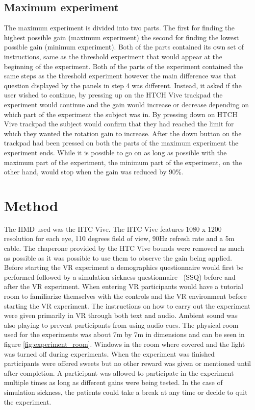 \subsection{Maximum experiment}
The maximum experiment is divided into two parts. The first for finding the highest possible gain (maximum experiment) the second for finding the lowest possible gain (minimum experiment). Both of the parts contained its own set of instructions, same as the threshold experiment that would appear at the beginning of the experiment. Both of the parts of the experiment contained the same steps as the threshold experiment however the main difference was that question displayed by the panels in step 4 was different. Instead, it asked if the user wished to continue, by pressing up on the HTCH Vive trackpad the experiment would continue and the gain would increase or decrease depending on which part of the experiment the subject was in. By pressing down on HTCH Vive trackpad the subject would confirm that they had reached the limit for which they wanted the rotation gain to increase. After the down button on the trackpad had been pressed on both the parts of the maximum experiment the experiment ends. While it is possible to go on as long as possible with the maximum part of the experiment, the minimum part of the experiment, on the other hand, would stop when the gain was reduced by 90\%.






\section{Method}
The HMD used was the HTC Vive. The HTC Vive features 1080 x 1200 resolution for each eye, 110 degrees field of view, 90Hz refresh rate and a 5m cable. The chaperone provided by the HTC Vive bounds were removed as much as possible as it was possible to use them to observe the gain being applied. Before starting the VR experiment a demographics questionnaire would first be performed followed by a simulation sickness questionnaire~\cite{kennedy1993simulator} (SSQ) before and after the VR experiment. When entering VR participants would have a tutorial room to familiarize themselves with the controls and the VR environment before starting the VR experiment. The instructions on how to carry out the experiment were given primarily in VR through both text and audio. Ambient sound was also playing to prevent participants from using audio cues. The physical room used for the experiments was about 7m by 7m in dimensions and can be seen in figure \ref{fig:experiment_room}. Windows in the room where covered and the light was turned off during experiments. When the experiment was finished participants were offered sweets but no other reward was given or mentioned until after completion. A participant was allowed to participate in the experiment multiple times as long as different gains were being tested. In the case of simulation sickness, the patients could take a break at any time or decide to quit the experiment.

